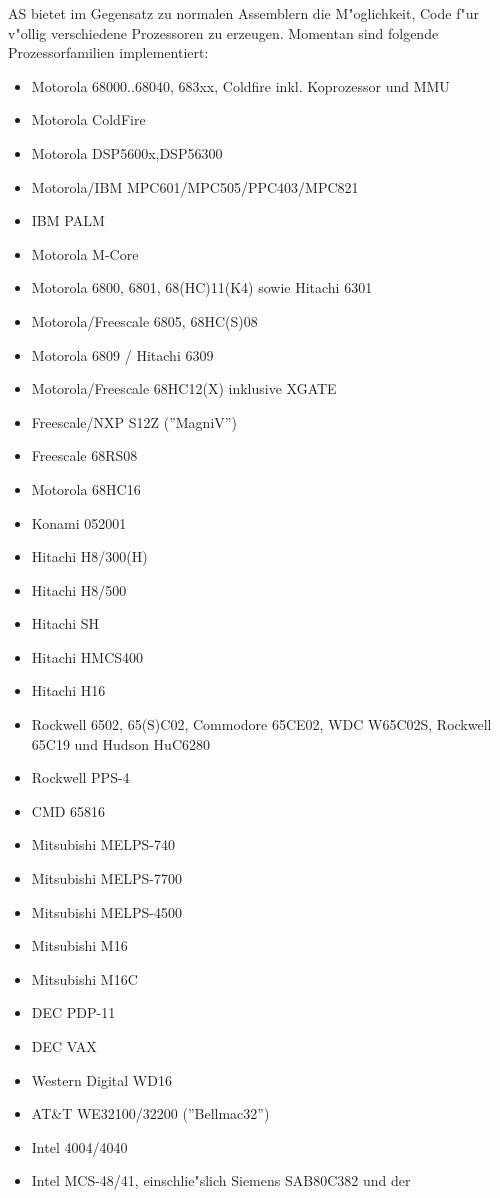 \documentclass[12pt,a4paper,twoside]{report}
\newcommand{\asname}{AS}
\begin{document}
\asname{} bietet im Gegensatz zu normalen Assemblern die M"oglichkeit, Code
f"ur v"ollig verschiedene Prozessoren zu erzeugen.  Momentan sind
folgende Prozessorfamilien implementiert:
\begin{itemize}
\item{Motorola 68000..68040, 683xx, Coldfire inkl. Koprozessor und MMU}
\item{Motorola ColdFire}
\item{Motorola DSP5600x,DSP56300}
\item{Motorola/IBM MPC601/MPC505/PPC403/MPC821}
\item{IBM PALM}
\item{Motorola M-Core}
\item{Motorola 6800, 6801, 68(HC)11(K4) sowie Hitachi 6301}
\item{Motorola/Freescale 6805, 68HC(S)08}
\item{Motorola 6809 / Hitachi 6309}
\item{Motorola/Freescale 68HC12(X) inklusive XGATE}
\item{Freescale/NXP S12Z (''MagniV'')}
\item{Freescale 68RS08}
\item{Motorola 68HC16}
\item{Konami 052001}
\item{Hitachi H8/300(H)}
\item{Hitachi H8/500}
\item{Hitachi SH}
\item{Hitachi HMCS400}
\item{Hitachi H16}
\item{Rockwell 6502, 65(S)C02, Commodore 65CE02, WDC W65C02S, Rockwell 65C19 und
      Hudson HuC6280}
\item{Rockwell PPS-4}
\item{CMD 65816}
\item{Mitsubishi MELPS-740}
\item{Mitsubishi MELPS-7700}
\item{Mitsubishi MELPS-4500}
\item{Mitsubishi M16}
\item{Mitsubishi M16C}
\item{DEC PDP-11}
\item{DEC VAX}
\item{Western Digital WD16}
\item{AT\&T WE32100/32200 (''Bellmac32'')}
\item{Intel 4004/4040}
\item{Intel MCS-48/41, einschlie"slich Siemens SAB80C382 und der
}
\end{itemize}
\end{document}
